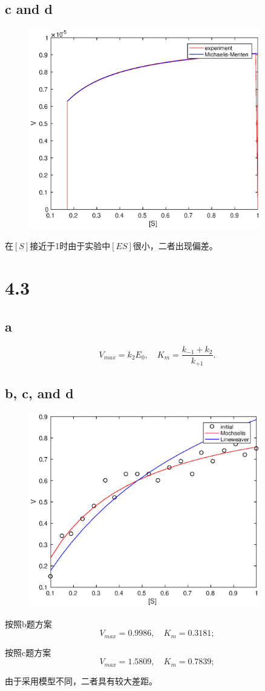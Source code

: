 \documentclass[a4paper,  11pt]{ctexart}
\begin{document}
\subsection*{c and d}
\begin{figure}[H]
  \centering 
  \includegraphics[width=0.9\textwidth]{fig3.eps}
\end{figure}
在$[S]$接近于1时由于实验中$[ES]$很小，二者出现偏差。
\section*{4.3}
\subsection*{a}
\[
V_{max} = k_2E_0, \quad K_m = \frac{k_{-1}+k_2}{k_{+1}}.
\]
\subsection*{b, c, and d}
\begin{figure}[H]
  \centering 
  \includegraphics[width=0.9\textwidth]{fig4.eps}
\end{figure}
按照b题方案
\[  
  V_{max} = 0.9986, \quad K_{m} = 0.3181;
\]

按照c题方案
\[  
  V_{max} = 1.5809, \quad K_{m} = 0.7839;
\] 

由于采用模型不同，二者具有较大差距。
\end{document}
